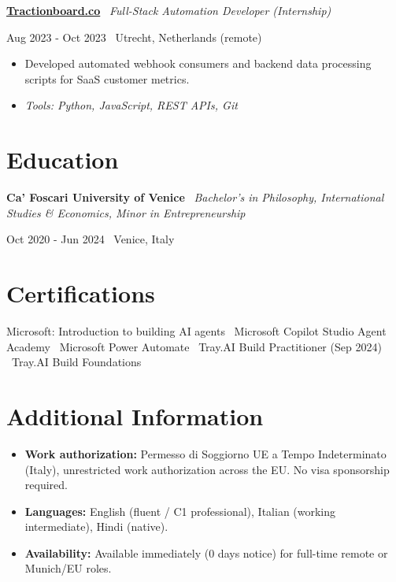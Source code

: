 \documentclass[a4paper,10pt]{article}
\newcommand{\role}[4]{%
  \vspace{2pt}\noindent
  \begin{minipage}[t]{0.70\textwidth}\raggedright\textbf{#1} \textbullet\ \textit{#3}\end{minipage}%
  \hfill
  \begin{minipage}[t]{0.28\textwidth}\raggedleft\footnotesize\color{gray}#2 \textbullet\ #4\end{minipage}%
  \vspace{1pt}%
}
\begin{document}
\role{\href{https://tractionboard.co}{Tractionboard.co}}{Aug 2023 - Oct 2023}{Full-Stack Automation Developer (Internship)}{Utrecht, Netherlands (remote)}
\begin{itemize}
  \item Developed automated webhook consumers and backend data processing scripts for SaaS customer metrics.
  \item \textit{Tools: Python, JavaScript, REST APIs, Git}
\end{itemize}

\section{Education}
\role{Ca' Foscari University of Venice}{Oct 2020 - Jun 2024}{Bachelor's in Philosophy, International Studies \& Economics, Minor in Entrepreneurship}{Venice, Italy}

\section{Certifications}
Microsoft: Introduction to building AI agents \textbullet\ Microsoft Copilot Studio Agent Academy \textbullet\ Microsoft Power Automate \textbullet\ Tray.AI Build Practitioner (Sep 2024) \textbullet\ Tray.AI Build Foundations

\section{Additional Information}
\begin{itemize}
  \item \textbf{Work authorization:} Permesso di Soggiorno UE a Tempo Indeterminato (Italy), unrestricted work authorization across the EU. No visa sponsorship required.
  \item \textbf{Languages:} English (fluent / C1 professional), Italian (working intermediate), Hindi (native).
  \item \textbf{Availability:} Available immediately (0 days notice) for full-time remote or Munich/EU roles.
\end{itemize}

\end{document}
